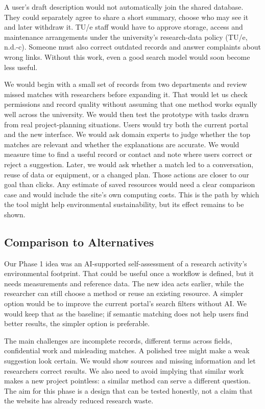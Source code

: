 \documentclass[11pt,a4paper]{article}
\begin{document}
A user's draft description would not automatically join the shared database. They could separately agree to share a short summary, choose who may see it and later withdraw it. TU/e staff would have to approve storage, access and maintenance arrangements under the university's research-data policy (TU/e, n.d.-c). Someone must also correct outdated records and answer complaints about wrong links. Without this work, even a good search model would soon become less useful.

We would begin with a small set of records from two departments and review missed matches with researchers before expanding it. That would let us check permissions and record quality without assuming that one method works equally well across the university. We would then test the prototype with tasks drawn from real project-planning situations. Users would try both the current portal and the new interface. We would ask domain experts to judge whether the top matches are relevant and whether the explanations are accurate. We would measure time to find a useful record or contact and note where users correct or reject a suggestion. Later, we would ask whether a match led to a conversation, reuse of data or equipment, or a changed plan. Those actions are closer to our goal than clicks. Any estimate of saved resources would need a clear comparison case and would include the site's own computing costs. This is the path by which the tool might help environmental sustainability, but its effect remains to be shown.

\subsection*{Comparison to Alternatives}

Our Phase 1 idea was an AI-supported self-assessment of a research activity's environmental footprint. That could be useful once a workflow is defined, but it needs measurements and reference data. The new idea acts earlier, while the researcher can still choose a method or reuse an existing resource. A simpler option would be to improve the current portal's search filters without AI. We would keep that as the baseline; if semantic matching does not help users find better results, the simpler option is preferable.

The main challenges are incomplete records, different terms across fields, confidential work and misleading matches. A polished tree might make a weak suggestion look certain. We would show sources and missing information and let researchers correct results. We also need to avoid implying that similar work makes a new project pointless: a similar method can serve a different question. The aim for this phase is a design that can be tested honestly, not a claim that the website has already reduced research waste.
\end{document}
